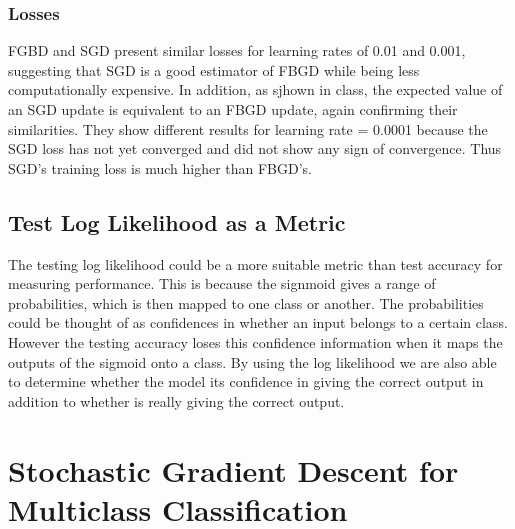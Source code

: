 \documentclass[11pt,letterpaper,titlepage]{article}
\begin{document}
	\subsubsection{Losses}
	FGBD and SGD present similar losses for learning rates of 0.01 and 0.001, suggesting that SGD is a good estimator of FBGD while being less computationally expensive. In addition, as sjhown in class, the expected value of an SGD update is equivalent to an FBGD update, again confirming their similarities. They show different results for learning rate = 0.0001 because the SGD loss has not yet converged and did not show any sign of convergence. Thus SGD's training loss is much higher than FBGD's.
	\subsection{Test Log Likelihood as a Metric}
	The testing log likelihood could be a more suitable metric than test accuracy for measuring performance. This is because the signmoid gives a range of probabilities, which is then mapped to one class or another. The probabilities could be thought of as confidences in whether an input belongs to a certain class. However the testing accuracy loses this confidence information when it maps the outputs of the sigmoid onto a class. By using the log likelihood we are also able to determine whether the model its confidence in giving the correct output in addition to whether is really giving the correct output. 
	\section{Stochastic Gradient Descent for Multiclass Classification}
	
	
	
\end{document}
